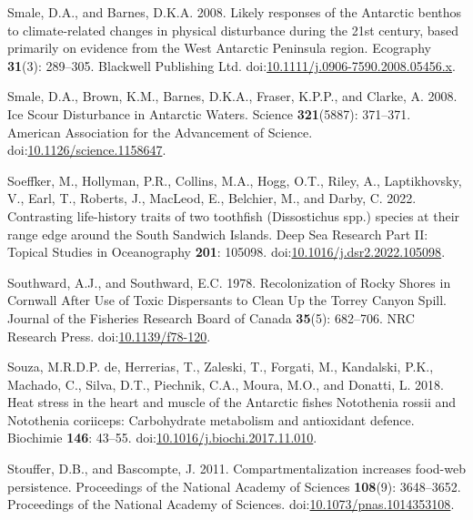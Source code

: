 \documentclass[
]{article}
\newlength{\cslhangindent}
\newenvironment{CSLReferences}[2] %
 {\begin{list}{}{%
  \setlength{\itemindent}{0pt}
  \setlength{\leftmargin}{0pt}
  \setlength{\parsep}{0pt}
  \ifodd #1
   \setlength{\leftmargin}{\cslhangindent}
   \setlength{\itemindent}{-1\cslhangindent}
  \fi
  \setlength{\itemsep}{#2\baselineskip}}}
 {\end{list}}
\begin{document}
\begin{CSLReferences}{1}{0}
Smale, D.A., and Barnes, D.K.A. 2008. Likely responses of the
{Antarctic} benthos to climate-related changes in physical disturbance
during the 21st century, based primarily on evidence from the {West
Antarctic Peninsula} region. Ecography \textbf{31}(3): 289--305.
Blackwell Publishing Ltd.
doi:\href{https://doi.org/10.1111/j.0906-7590.2008.05456.x}{10.1111/j.0906-7590.2008.05456.x}.

Smale, D.A., Brown, K.M., Barnes, D.K.A., Fraser, K.P.P., and Clarke, A.
2008. Ice {Scour Disturbance} in {Antarctic Waters}. Science
\textbf{321}(5887): 371--371. American Association for the Advancement
of Science.
doi:\href{https://doi.org/10.1126/science.1158647}{10.1126/science.1158647}.

Soeffker, M., Hollyman, P.R., Collins, M.A., Hogg, O.T., Riley, A.,
Laptikhovsky, V., Earl, T., Roberts, J., MacLeod, E., Belchier, M., and
Darby, C. 2022. Contrasting life-history traits of two toothfish
({Dissostichus} spp.) species at their range edge around the {South
Sandwich Islands}. Deep Sea Research Part II: Topical Studies in
Oceanography \textbf{201}: 105098.
doi:\href{https://doi.org/10.1016/j.dsr2.2022.105098}{10.1016/j.dsr2.2022.105098}.

Southward, A.J., and Southward, E.C. 1978. Recolonization of {Rocky
Shores} in {Cornwall After Use} of {Toxic Dispersants} to {Clean Up} the
{Torrey Canyon Spill}. Journal of the Fisheries Research Board of Canada
\textbf{35}(5): 682--706. NRC Research Press.
doi:\href{https://doi.org/10.1139/f78-120}{10.1139/f78-120}.

Souza, M.R.D.P. de, Herrerias, T., Zaleski, T., Forgati, M., Kandalski,
P.K., Machado, C., Silva, D.T., Piechnik, C.A., Moura, M.O., and
Donatti, L. 2018. Heat stress in the heart and muscle of the {Antarctic}
fishes {Notothenia} rossii and {Notothenia} coriiceps: {Carbohydrate}
metabolism and antioxidant defence. Biochimie \textbf{146}: 43--55.
doi:\href{https://doi.org/10.1016/j.biochi.2017.11.010}{10.1016/j.biochi.2017.11.010}.

Stouffer, D.B., and Bascompte, J. 2011. Compartmentalization increases
food-web persistence. Proceedings of the National Academy of Sciences
\textbf{108}(9): 3648--3652. Proceedings of the National Academy of
Sciences.
doi:\href{https://doi.org/10.1073/pnas.1014353108}{10.1073/pnas.1014353108}.


\end{CSLReferences}
\end{document}
